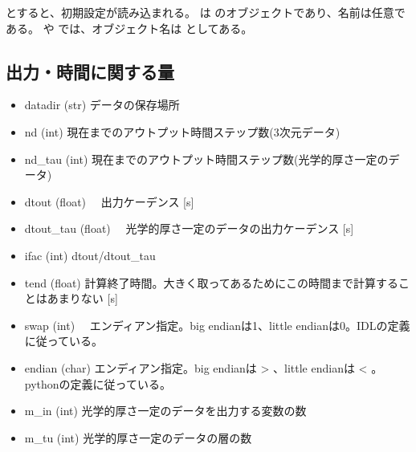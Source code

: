 \documentclass[letterpaper,10pt,dvipdfmx,report]{sphinxmanual}
\begin{document}
とすると、初期設定が読み込まれる。  は  のオブジェクトであり、名前は任意である。  や  では、オブジェクト名は  としてある。


\subsection{出力・時間に関する量}
\label{\detokenize{notation:id1}}\begin{itemize}
\item {} 
datadir (str) \sphinxhyphen{}\sphinxhyphen{} データの保存場所

\item {} 
nd (int) \sphinxhyphen{}\sphinxhyphen{} 現在までのアウトプット時間ステップ数(3次元データ)

\item {} 
nd\_tau (int) \sphinxhyphen{}\sphinxhyphen{} 現在までのアウトプット時間ステップ数(光学的厚さ一定のデータ)

\item {} 
dtout (float) \sphinxhyphen{}\sphinxhyphen{}　出力ケーデンス {[}s{]}

\item {} 
dtout\_tau (float) \sphinxhyphen{}\sphinxhyphen{}　光学的厚さ一定のデータの出力ケーデンス {[}s{]}

\item {} 
ifac (int) \sphinxhyphen{}\sphinxhyphen{} dtout/dtout\_tau

\item {} 
tend (float) \sphinxhyphen{}\sphinxhyphen{} 計算終了時間。大きく取ってあるためにこの時間まで計算することはあまりない {[}s{]}

\item {} 
swap (int) \sphinxhyphen{}\sphinxhyphen{}　エンディアン指定。big endianは1、little endianは0。IDLの定義に従っている。

\item {} 
endian (char) \sphinxhyphen{}\sphinxhyphen{} エンディアン指定。big endianは \textgreater{} 、little endianは \textless{} 。pythonの定義に従っている。

\item {} 
m\_in (int) \sphinxhyphen{}\sphinxhyphen{} 光学的厚さ一定のデータを出力する変数の数

\item {} 
m\_tu (int) \sphinxhyphen{}\sphinxhyphen{} 光学的厚さ一定のデータの層の数

\end{itemize}
\end{document}
